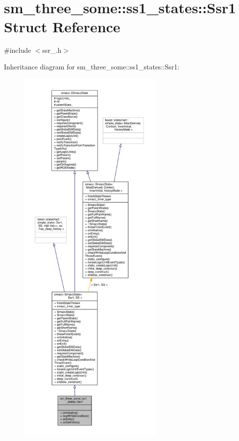 \hypertarget{structsm__three__some_1_1ss1__states_1_1Ssr1}{}\section{sm\+\_\+three\+\_\+some\+:\+:ss1\+\_\+states\+:\+:Ssr1 Struct Reference}
\label{structsm__three__some_1_1ss1__states_1_1Ssr1}


{\ttfamily \#include $<$ssr\+\_.\+h$>$}



Inheritance diagram for sm\+\_\+three\+\_\+some\+:\+:ss1\+\_\+states\+:\+:Ssr1\+:\nopagebreak
\begin{figure}[H]
\begin{center}
\leavevmode
\includegraphics[height=550pt]{structsm__three__some_1_1ss1__states_1_1Ssr1__inherit__graph}
\end{center}
\end{figure}


